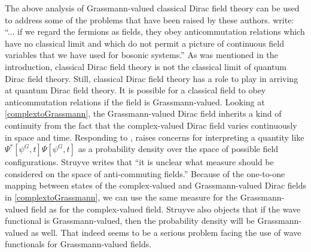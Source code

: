\documentclass[onecolumn,secnumarabic,amsmath,amssymb,balancelastpage,nofootinbib]{article}
\begin{document}
The above analysis of Grassmann-valued classical Dirac field theory can be used to address some of the problems that have been raised by these authors.  \citet[pg.\ 374]{bohm1987} write: ``... if we regard the fermions as fields, they obey anticommutation relations which have no classical limit and which do not permit a picture of continuous field variables that we have used for bosonic systems.''  As was mentioned in the introduction, classical Dirac field theory is not the classical limit of quantum Dirac field theory.  Still, classical Dirac field theory has a role to play in arriving at quantum Dirac field theory.  It is possible for a classical field to obey anticommutation relations if the field is Grassmann-valued.  Looking at \eqref{complextoGrassmann}, the Grassmann-valued Dirac field inherits a kind of continuity from the fact that the complex-valued Dirac field varies continuously in space and time.  Responding to \citet{valentini1992, valentini1996}, \citet[sec.\ 9.2.2]{struyve2010} raises concerns for interpreting a quantity like $\Psi^*[\psi^G,t]\Psi[\psi^G,t]$ as a probability density over the space of possible field configurations.  Struyve writes that ``it is unclear what measure should be considered on the space of anti-commuting fields.''  Because of the one-to-one mapping between states of the complex-valued and Grassmann-valued Dirac fields in \eqref{complextoGrassmann}, we can use the same measure for the Grassmann-valued field as for the complex-valued field.  Struyve also objects that if the wave functional is Grassmann-valued, then the probability density will be Grassmann-valued as well.  That indeed seems to be a serious problem facing the use of wave functionals for Grassmann-valued fields.
\end{document}
